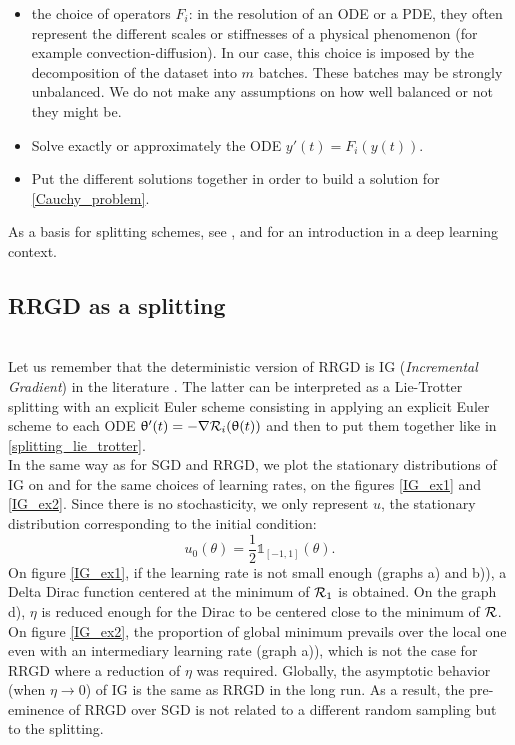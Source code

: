 \documentclass[article,authoryear,jmlmc]{beg_32}             %
\begin{document}
\begin{itemize}
	\item the choice of operators $F_i$: in the resolution of an ODE or a PDE, they often represent the different scales or stiffnesses of a physical phenomenon (for example convection-diffusion). In our case, this choice is imposed by the decomposition of the dataset into $m$ batches. 
          These batches may be strongly unbalanced. We do not make any assumptions on how well balanced or not they might be.
	\item Solve exactly or approximately the ODE $y'(t)=F_i(y(t))$.
	\item Put the different solutions together in order to build a solution for \eqref{Cauchy_problem}. 
\end{itemize}
As a basis for splitting schemes, see \cite{splitting_ode_review,splitting_ode_review2}, and \cite{despres2022neural} for an introduction in a deep learning context.

\subsection{RRGD as a splitting}
~~\\
Let us remember that the deterministic version of RRGD is IG ({\it Incremental Gradient}) in the literature \cite{IG_proximal,despres2022neural}. The latter can be interpreted as a Lie-Trotter
splitting with an explicit Euler scheme consisting in applying an explicit Euler scheme to each ODE $\uptheta'(t)=-\nabla \mathcal{R}_i(\uptheta(t))$ and then to put them together like in \eqref{splitting_lie_trotter}. \\
In the same way as for SGD and RRGD, we plot the stationary distributions of IG on \exOne and \exTwo for the same choices of learning rates, on the figures \ref{IG_ex1} and \ref{IG_ex2}. Since there is no stochasticity, we only represent $u$, the stationary distribution corresponding to the initial condition:
\begin{equation*}
	u_0(\theta) = \frac{1}{2} \mathds{1}_{[-1,1]}(\theta).
\end{equation*}
On figure \ref{IG_ex1}, if the learning rate is not small enough (graphs a) and b)), a Delta Dirac function centered at the minimum of $\mathcal{R}_1$ is obtained. On the graph d), $\eta$ is reduced enough for the Dirac to be centered close to the minimum of $\mathcal{R}$. On figure \ref{IG_ex2}, the proportion of global minimum prevails over the local one even with an intermediary learning rate (graph a)), which is not the case for RRGD where a reduction of $\eta$ was required. Globally, the asymptotic behavior (when $\eta \to 0$) of IG is the same as RRGD in the long run. As a result, the pre-eminence of RRGD over SGD is not related to a different random sampling but to the splitting.
\end{document}
